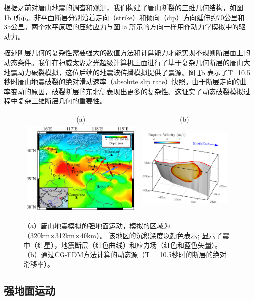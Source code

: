 \documentclass[degree=doctor]{thuthesis}
\begin{document}
根据之前对唐山地震的调查和观测，我们构建了唐山断裂的三维几何结构，如图\ref{fig:tangshan_geomap}b 所示。非平面断层分别沿着走向（strike）和倾向（dip）方向延伸约70公里和35公里。两个水平原理的压缩应力与图\ref{fig:tangshan_geomap}a 所示的方向一样用作动力学模拟中的驱动力。

描述断层几何的复杂性需要强大的数值方法和计算能力才能实现不规则断层面上的动态条件。我们在神威太湖之光超级计算机上面进行了基于复杂几何断层的唐山大地震动力破裂模拟，这位后续的地震波传播模拟提供了震源。图 \ref{fig:tangshan_geomap}b 表示了T=10.5秒时唐山地震破裂的绝对滑动速率（absolute slip rate）快照。由于断层走向的曲率变动的原因，破裂断层的东北侧表现出更多的复杂性。这证实了动态破裂模拟过程中复杂三维断层几何的重要性。

\begin{figure}[t]
\begin{tabular}{cc}
(a) & (b) \\
    \includegraphics[width=0.5\columnwidth]{Tangshan_geomap.eps} &
    \includegraphics[width=0.5\columnwidth]{Tangshan_Fault1.eps}
\end{tabular}
    \caption{
（a）唐山地震模拟的强地面运动，模拟的区域为（320km×312km×40km）。 该地区的沉积深度以颜色表示; 显示了震中（红星），地震断层（红色曲线）和应力场（红色和蓝色矢量）。 （b）通过CG-FDM方法计算的动态源（T = 10.5秒时的断层的绝对滑移率）。}
    \label{fig:tangshan_geomap}
\end{figure}


\subsection{强地面运动}
\end{document}
